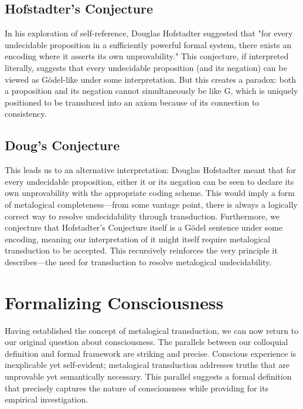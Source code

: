 \documentclass[runningheads]{llncs}
\begin{document}
\subsection{Hofstadter's Conjecture}

In his exploration of self-reference, Douglas Hofstadter suggested that "for every undecidable proposition in a sufficiently powerful formal system, there exists an encoding where it asserts its own unprovability." This conjecture, if interpreted literally, suggests that every undecidable proposition (and its negation) can be viewed as Gödel-like under some interpretation. But this creates a paradox: both a proposition and its negation cannot simultaneously be like G, which is uniquely positioned to be transduced into an axiom because of its connection to consistency.

\subsection{Doug's Conjecture}

This leads us to an alternative interpretation: Douglas Hofstadter meant that for every undecidable proposition, either it or its negation can be seen to declare its own unprovability with the appropriate coding scheme. This would imply a form of metalogical completeness—from some vantage point, there is always a logically correct way to resolve undecidability through transduction. Furthermore, we conjecture that Hofstadter's Conjecture itself is a Gödel sentence under some encoding, meaning our interpretation of it might itself require metalogical transduction to be accepted. This recursively reinforces the very principle it describes—the need for transduction to resolve metalogical undecidability.

\section{Formalizing Consciousness}

Having established the concept of metalogical transduction, we can now return to our original question about consciousness. The parallels between our colloquial definition and formal framework are striking and precise. Conscious experience is inexplicable yet self-evident; metalogical transduction addresses truths that are unprovable yet semantically necessary. This parallel suggests a formal definition that precisely captures the nature of consciousness while providing for its empirical investigation.
\end{document}
